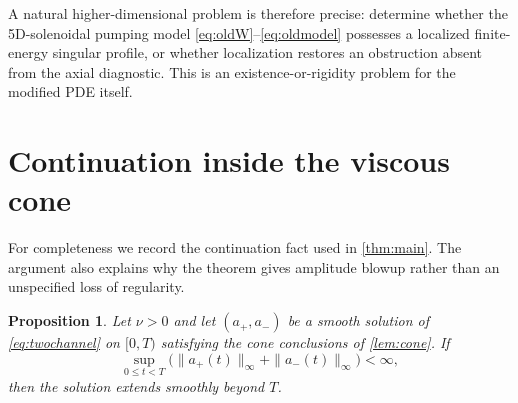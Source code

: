 \documentclass[11pt]{article}
\newtheorem{proposition}[theorem]{Proposition}
\theoremstyle{definition}
\begin{document}
A natural higher-dimensional problem is therefore precise: determine whether the 5D-solenoidal pumping model \eqref{eq:oldW}--\eqref{eq:oldmodel} possesses a localized finite-energy singular profile, or whether localization restores an obstruction absent from the axial diagnostic.  This is an existence-or-rigidity problem for the modified PDE itself.

\appendix

\section{Continuation inside the viscous cone}\label{app:continuation}

For completeness we record the continuation fact used in \cref{thm:main}.  The argument also explains why the theorem gives amplitude blowup rather than an unspecified loss of regularity.

\begin{proposition}\label{prop:continue}
Let $\nu>0$ and let $(a_+,a_-)$ be a smooth solution of \eqref{eq:twochannel} on $[0,T)$ satisfying the cone conclusions of \cref{lem:cone}.  If
\begin{equation}\label{eq:Astar}
 \sup_{0\le t<T}
 \bigl(\|a_+(t)\|_\infty+\|a_-(t)\|_\infty\bigr)<\infty,
\end{equation}
then the solution extends smoothly beyond $T$.
\end{proposition}
\end{document}
